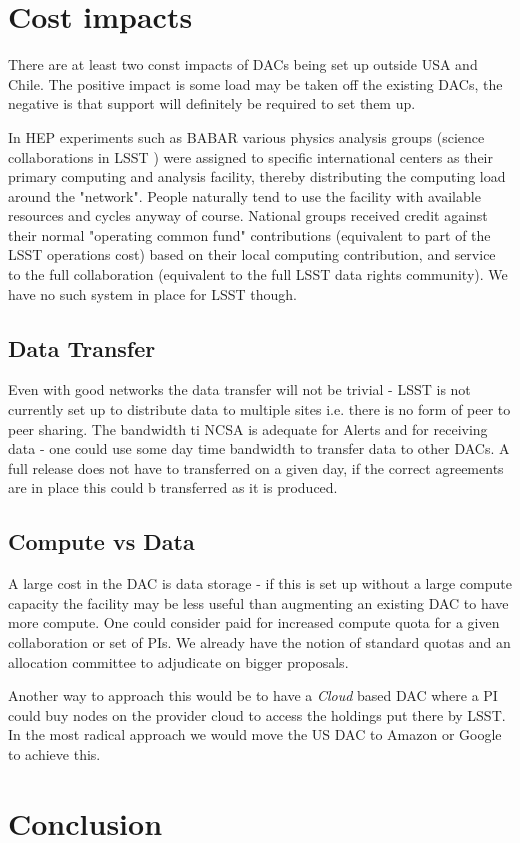 \section{Cost impacts}
There are at least two const impacts of DACs being set up outside USA and Chile. The positive impact is some load may be taken off the existing DACs, the negative is that support will definitely be required to set them up.

In HEP experiments such as  BABAR various physics analysis groups (science collaborations in LSST ) were assigned to specific international centers as their primary computing and analysis facility, thereby distributing the computing load around the "network". People naturally tend to use the facility with available resources and cycles anyway of course. National groups received credit against their normal "operating common fund" contributions (equivalent to part of the LSST operations cost) based on their local computing contribution, and service to the full collaboration (equivalent to the full LSST data rights community). We have no such system in place for LSST though.

\subsection{Data Transfer}
Even with good networks the data transfer will not be trivial - LSST is not currently set up to distribute data to multiple sites i.e. there is no form of peer to peer sharing. The bandwidth ti NCSA is adequate for Alerts and for receiving data - one could use some day time bandwidth to transfer data to other DACs. A full release does not have to transferred on a given day, if the correct agreements are in place this could b transferred as it is produced.

\subsection{Compute vs Data}
A large cost in the DAC is data storage - if this is set up without a large compute capacity the facility may be less useful  than augmenting an existing DAC to have more compute. One could consider paid for increased compute quota for a given collaboration or set of PIs.
We already have the notion of standard quotas and an allocation committee to adjudicate on bigger proposals.

Another way to approach this would be to have a \emph{Cloud} based DAC where a PI could buy nodes on the provider cloud to access the holdings put there by LSST. In the most radical approach we would move the US DAC to Amazon or Google to achieve this.


\section{Conclusion}
